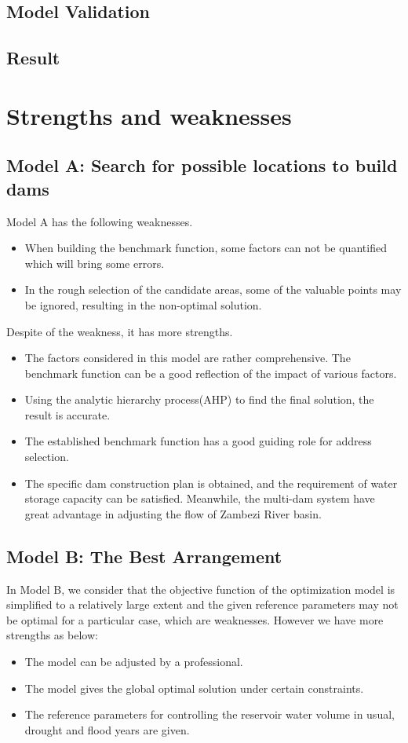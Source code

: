 \documentclass{mcmthesis}
\begin{document}
\subsection{Model Validation}

\subsection{Result}

\section{Strengths and weaknesses}
\subsection{Model A: Search for possible locations to build dams}
Model A has the following weaknesses.
\begin{itemize}
\item When building the benchmark function, some factors can not be quantified which will bring some errors.
\item In the rough selection of the candidate areas, some of the valuable points may be ignored, resulting in the non-optimal solution.
\end{itemize}
Despite of the weakness, it has more strengths.
\begin{itemize}
  \item The factors considered in this model are rather comprehensive. The benchmark function can be a good reflection of the impact of various factors.
  \item Using the analytic hierarchy process(AHP) to find the final solution, the result is accurate.
  \item The established benchmark function has a good guiding role for address selection.
  \item The specific dam construction plan is obtained, and the requirement of water storage capacity can be satisfied. Meanwhile, the multi-dam system have great advantage in adjusting the flow of Zambezi River basin.
\end{itemize}

\subsection{Model B: The Best Arrangement}
In Model B, we consider that the objective function of the optimization model is simplified to a relatively large extent and the given reference parameters may not be optimal for a particular case, which are weaknesses. However we have more strengths as below:
\begin{itemize}
  \item The model can be adjusted by a professional.
  \item The model gives the global optimal solution under certain constraints.
  \item The reference parameters for controlling the reservoir water volume in usual, drought and flood years are given.
\end{itemize}
\end{document}
